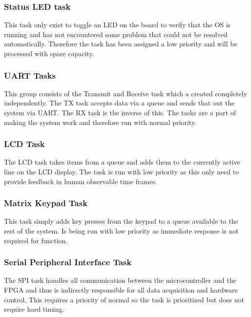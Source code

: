 \documentclass[../../../main]{subfiles}
\begin{document}

\subsubsection{Status LED task}

This task only exist to toggle an LED on the board to verify that the OS is running and has not encountered some problem that could not be resolved automatically. Therefore the task has been assigned a low priority and will be processed with spare capacity.

\subsubsection{UART Tasks}%

This group consists of the Transmit and Receive task which a created completely independently. The TX task accepts data via a queue and sends that out the system via UART. The RX task is the inverse of this. The tasks are a part of making the system work and therefore run with normal priority. 


\subsubsection{LCD Task}

The LCD task takes items from a queue and adds them to the currently active line on the LCD display. The task is run with low priority as this only need to provide feedback in human observable time frames.

\subsubsection{Matrix Keypad Task}

This task simply adds key presses from the keypad to a queue available to the rest of the system. Is being run with low priority as immediate response is not required for function.

\subsubsection{Serial Peripheral Interface Task}

The SPI task handles all communication between the microcontroller and the FPGA and thus is indirectly responsible for all data acquisition and hardware control. This requires a priority of normal so the task is prioritized but does not require hard timing.  
\end{document}
